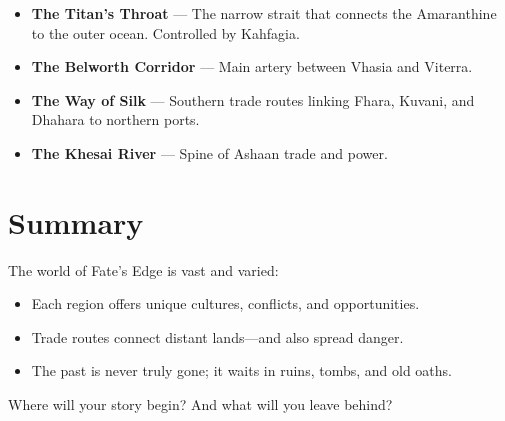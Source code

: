 \begin{itemize}
  \item \textbf{The Titan's Throat} — The narrow strait that connects the Amaranthine to the outer ocean. Controlled by Kahfagia.
  \item \textbf{The Belworth Corridor} — Main artery between Vhasia and Viterra.
  \item \textbf{The Way of Silk} — Southern trade routes linking Fhara, Kuvani, and Dhahara to northern ports.
  \item \textbf{The Khesai River} — Spine of Ashaan trade and power.
\end{itemize}

\section{Summary}

The world of Fate's Edge is vast and varied:

\begin{itemize}
  \item Each region offers unique cultures, conflicts, and opportunities.
  \item Trade routes connect distant lands—and also spread danger.
  \item The past is never truly gone; it waits in ruins, tombs, and old oaths.
\end{itemize}

Where will your story begin? And what will you leave behind?
